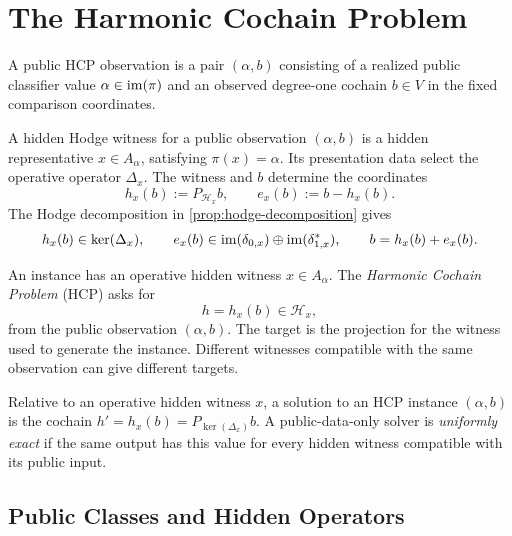 \section{The Harmonic Cochain Problem}\label{sec:hcp-definition}

\begin{definition}\label{def:public-observation}
  A public HCP observation is a pair \((\alpha,b)\) consisting of a realized
  public classifier value \(\alpha\in\operatorname{im}(\pi)\) and an observed degree-one
  cochain \(b\in V\) in the fixed comparison coordinates.
\end{definition}

\begin{definition}\label{def:hidden-hodge-witness}
  A hidden Hodge witness for a public observation \((\alpha,b)\) is a hidden
  representative \(x\in A_\alpha\), satisfying \(\pi(x)=\alpha\). Its
  presentation data select the operative operator \(\Delta_x\). The witness
  and \(b\) determine the coordinates
  \[
    h_x(b):=P_{\mathcal H_x}b,
    \qquad
    e_x(b):=b-h_x(b).
  \]
  The Hodge decomposition in \cref{prop:hodge-decomposition} gives
  \[
    h_x(b)\in\ker(\Delta_x),\qquad
    e_x(b)\in
      \operatorname{im}(\delta_{0,x})\oplus\operatorname{im}(\delta_{1,x}^\ast),\qquad
    b=h_x(b)+e_x(b).
  \]
\end{definition}

\begin{definition}\label{def:hcp}
  An instance has an operative hidden witness \(x\in A_\alpha\).
  The \emph{Harmonic Cochain Problem} (HCP) asks for
  \[
    h=h_x(b)\in\mathcal H_x,
  \]
  from the public observation \((\alpha,b)\). The target is the projection
  for the witness used to generate the instance. Different witnesses
  compatible with the same observation can give different targets.
\end{definition}

\begin{definition}\label{def:hcp-solution}
  Relative to an operative hidden witness \(x\), a solution to an
  HCP instance \((\alpha,b)\) is the cochain
  \(h'=h_x(b)=P_{\ker(\Delta_x)}b\). A public-data-only solver is
  \emph{uniformly exact}
  if the same output has this value for every hidden witness compatible with
  its public input.
\end{definition}

\subsection{Public Classes and Hidden Operators}\label{sec:mathematical-framework}

